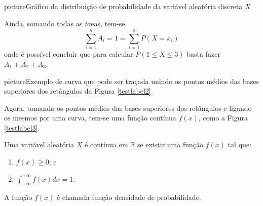 \documentclass[11pt,fleqn]{book}
\numberwithin{mpicture}{chapter}
\numberwithin{mtable}{chapter}
\numberwithin{mframe}{chapter}
\begin{document}
\begin{sidepicture}{1cm}{picture}{Gráfico da distribuição de probabilidade da variável aleatória discreta $X$}
	\label{testlabel2}
\end{sidepicture}

Ainda, somando todas as áreas, tem-se
\[
	\sum_{i=1}^{5} A_i = 1 = \sum_{i=1}^{5} P(X=x_i)
\]
onde é possível concluir que para calcular $P(1\leqslant X \leqslant 3)$ basta fazer $A_1 + A_2 + A_3$.
\newpage

\begin{sidepicture}{0cm}{picture}{Exemplo de curva que pode ser traçada unindo os pontos médios das bases superiores dos retângulos da Figura \ref{testlabel2}}
	\label{testlabel3}
\end{sidepicture}

Agora, tomando os pontos médios das bases superiores dos retângulos e ligando os mesmos por uma curva, tem-se uma função contínua $f(x)$, como a Figura \ref{testlabel3}.

\begin{definition}
	Uma variável aleatória $X$ é contínua em $\mathbb{R}$ se existir uma função $f(x)$ tal que:
	\begin{enumerate}[label={\roman*)}]
		\item $f(x) \geqslant 0$; e
		\item $\displaystyle \int_{-\infty}^{+\infty} f(x)dx = 1$.
	\end{enumerate}
	
	A função $f(x)$ é chamada função densidade de probabilidade.
\end{definition}
\end{document}
